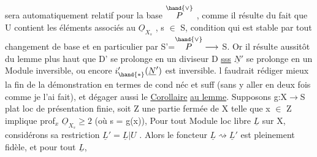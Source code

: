 
sera automatiquement  relatif pour la base $\overset{\hand{\vee}}{P}$ , comme il
résulte du fait que U contient les éléments associés au $\underline{O}_{X_s}$ , s $\in$ S,
condition qui est stable par tout changement de base et en particulier
par S'=$\overset{\hand{\vee}}{P} \longrightarrow$ S. Or il résulte aussitôt du lemme  plus haut que D' se
prolonge en un diviseur  D \uline{sss} $\underline{N}'$ se prolonge en un Module
inversible, ou encore $i'_{\hand{*}}(\underline{N}')$ est inversible.  l faudrait rédiger
mieux la fin de la démonstration en termes de cond néc et suff (sans y
aller en deux fois comme je l'ai fait), et dégager aussi  le
\uline{Corollaire}  \uline{au lemme}. Supposons g:X$\to$S plat loc de présentation finie,
soit Z une partie fermée de X telle que x $\in$ Z implique prof$_x$ $\underline{O}_{X_s} \geq 2$
(où s = g(x)), 
 Pour tout Module loc libre  $\underline{L}$ sur X,
considérons sa restriction $\underline{L}' = \underline{L}|U$ . Alors  le foncteur $\underline{L} \rightsquigarrow \underline{L}'$ est
pleinement fidèle, et pour  tout $\underline{L}$, 
